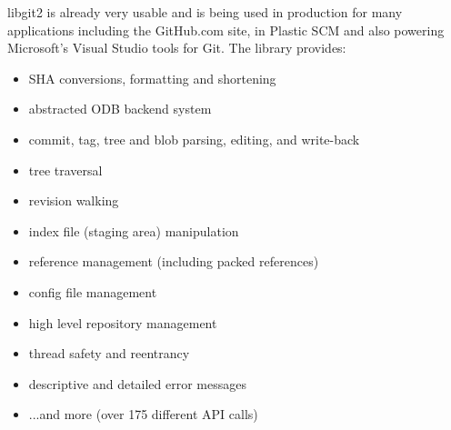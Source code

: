       libgit2 is already very usable and is being used in production for many applications including the GitHub.com site, in Plastic SCM and also powering Microsoft's Visual Studio tools for Git. The library provides:
      
      \begin{itemize}
        \item SHA conversions, formatting and shortening
        \item abstracted ODB backend system
        \item commit, tag, tree and blob parsing, editing, and write-back
        \item tree traversal
        \item revision walking
        \item index file (staging area) manipulation
        \item reference management (including packed references)
        \item config file management
        \item high level repository management
        \item thread safety and reentrancy
        \item descriptive and detailed error messages
        \item ...and more (over 175 different API calls)
      \end{itemize}